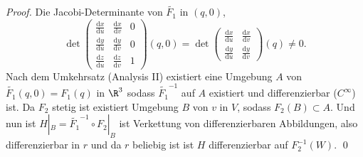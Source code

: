 \begin{remark}
\begin{proof}
    Die Jacobi-Determinante von \( \widetilde{F_1} \) in \( (q,0) \),
    \begin{equation*}
      \det \begin{pmatrix}
        \frac{\text{d}x}{\text{d}u} & \frac{\text{d}x}{\text{d}v} & 0 \\
        \frac{\text{d}y}{\text{d}u} & \frac{\text{d}y}{\text{d}v} & 0 \\
        \frac{\text{d}z}{\text{d}u} & \frac{\text{d}z}{\text{d}v} & 1
      \end{pmatrix}(q,0) = \det \begin{pmatrix}
        \frac{\text{d}x}{\text{d}u} & \frac{\text{d}x}{\text{d}v} \\
        \frac{\text{d}y}{\text{d}u} & \frac{\text{d}y}{\text{d}v}
      \end{pmatrix}(q) \neq 0\text{.}
    \end{equation*}
    Nach dem Umkehrsatz (Analysis II) existiert eine Umgebung \( A \) von \( \widetilde{F_1}(q,0) = F_1(q) \) in \( \R^3 \) sodass \( \widetilde{F_1}^{-1} \) auf \( A \) existiert und differenzierbar (\( C^\infty \)) ist. Da \( F_2 \) stetig ist existiert Umgebung \( B \) von \( v \) in \( V \), sodass \( F_2(B) \subset A \). Und nun ist \( H|_B = \widetilde{F_1}^{-1} \circ F_2|_B \) ist Verkettung von differenzierbaren Abbildungen, also differenzierbar in \( r \) und da \( r \) beliebig ist ist \( H \) differenzierbar auf \( F_2^{-1}(W) \). \qed{}
  \end{proof}
\end{remark}

